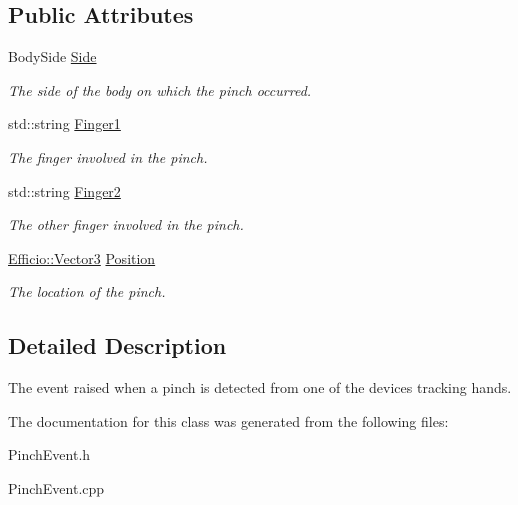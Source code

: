 \subsection*{Public Attributes}
\begin{DoxyCompactItemize}
\item 
Body\+Side \hyperlink{class_efficio_1_1_body_1_1_hands_1_1_pinch_event_a6e2960e2c67aab6150daf5545a9d12c0}{Side}\hypertarget{class_efficio_1_1_body_1_1_hands_1_1_pinch_event_a6e2960e2c67aab6150daf5545a9d12c0}{}\label{class_efficio_1_1_body_1_1_hands_1_1_pinch_event_a6e2960e2c67aab6150daf5545a9d12c0}

\begin{DoxyCompactList}\small\item\em The side of the body on which the pinch occurred. \end{DoxyCompactList}\item 
std\+::string \hyperlink{class_efficio_1_1_body_1_1_hands_1_1_pinch_event_ae3fe93a1dcdd300a706761151d6c89c0}{Finger1}\hypertarget{class_efficio_1_1_body_1_1_hands_1_1_pinch_event_ae3fe93a1dcdd300a706761151d6c89c0}{}\label{class_efficio_1_1_body_1_1_hands_1_1_pinch_event_ae3fe93a1dcdd300a706761151d6c89c0}

\begin{DoxyCompactList}\small\item\em The finger involved in the pinch. \end{DoxyCompactList}\item 
std\+::string \hyperlink{class_efficio_1_1_body_1_1_hands_1_1_pinch_event_a05fa0a0e91737c5666a82c256dc51f17}{Finger2}\hypertarget{class_efficio_1_1_body_1_1_hands_1_1_pinch_event_a05fa0a0e91737c5666a82c256dc51f17}{}\label{class_efficio_1_1_body_1_1_hands_1_1_pinch_event_a05fa0a0e91737c5666a82c256dc51f17}

\begin{DoxyCompactList}\small\item\em The other finger involved in the pinch. \end{DoxyCompactList}\item 
\hyperlink{class_efficio_1_1_vector3}{Efficio\+::\+Vector3} \hyperlink{class_efficio_1_1_body_1_1_hands_1_1_pinch_event_a8c47fee2527c496adb1f0343edd4033d}{Position}\hypertarget{class_efficio_1_1_body_1_1_hands_1_1_pinch_event_a8c47fee2527c496adb1f0343edd4033d}{}\label{class_efficio_1_1_body_1_1_hands_1_1_pinch_event_a8c47fee2527c496adb1f0343edd4033d}

\begin{DoxyCompactList}\small\item\em The location of the pinch. \end{DoxyCompactList}\end{DoxyCompactItemize}


\subsection{Detailed Description}
The event raised when a pinch is detected from one of the devices tracking hands. 

The documentation for this class was generated from the following files\+:\begin{DoxyCompactItemize}
\item 
Pinch\+Event.\+h\item 
Pinch\+Event.\+cpp\end{DoxyCompactItemize}
